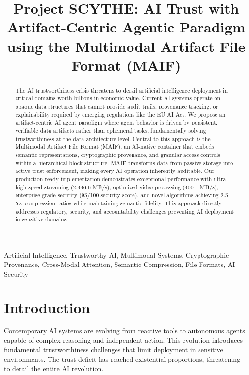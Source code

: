 \documentclass[conference]{IEEEtran}
\title{Project SCYTHE: AI Trust with Artifact-Centric Agentic Paradigm using the Multimodal Artifact File Format (MAIF)}
\author{
\IEEEauthorblockN{Cool Peeps Gang}
\IEEEauthorblockA{
Affiliation\\
Email: coolpeeps@owasp.org \& coolpeeps@industry.org}
}
\begin{document}
\maketitle

\begin{abstract}
The AI trustworthiness crisis threatens to derail artificial intelligence deployment in critical domains worth billions in economic value. Current AI systems operate on opaque data structures that cannot provide audit trails, provenance tracking, or explainability required by emerging regulations like the EU AI Act. We propose an artifact-centric AI agent paradigm where agent behavior is driven by persistent, verifiable data artifacts rather than ephemeral tasks, fundamentally solving trustworthiness at the data architecture level. Central to this approach is the Multimodal Artifact File Format (MAIF), an AI-native container that embeds semantic representations, cryptographic provenance, and granular access controls within a hierarchical block structure. MAIF transforms data from passive storage into active trust enforcement, making every AI operation inherently auditable. Our production-ready implementation demonstrates exceptional performance with ultra-high-speed streaming (2,446.6 MB/s), optimized video processing (400+ MB/s), enterprise-grade security (95/100 security score), and novel algorithms achieving 2.5-5× compression ratios while maintaining semantic fidelity. This approach directly addresses regulatory, security, and accountability challenges preventing AI deployment in sensitive domains.
\end{abstract}

\begin{IEEEkeywords}
Artificial Intelligence, Trustworthy AI, Multimodal Systems, Cryptographic Provenance, Cross-Modal Attention, Semantic Compression, File Formats, AI Security
\end{IEEEkeywords}

\section{Introduction}

Contemporary AI systems are evolving from reactive tools to autonomous agents capable of complex reasoning and independent action. This evolution introduces fundamental trustworthiness challenges that limit deployment in sensitive environments. The trust deficit has reached existential proportions, threatening to derail the entire AI revolution.
\end{document}
